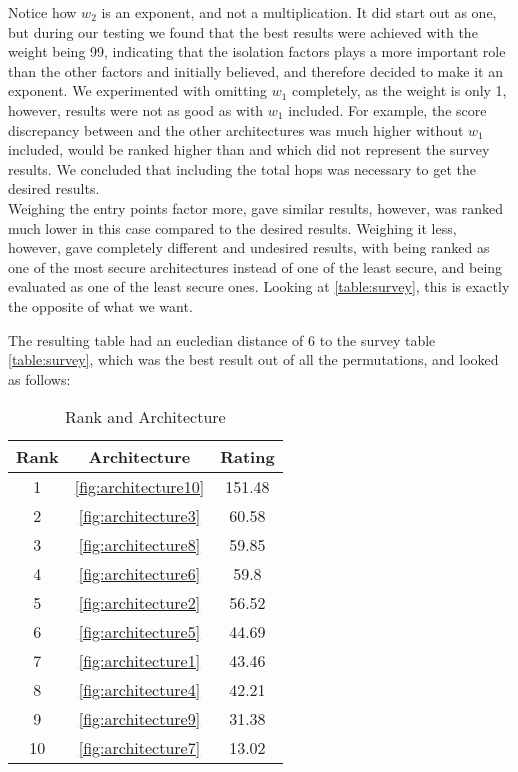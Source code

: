 Notice how $w_{2}$ is an exponent, and not a multiplication.
It did start out as one, but during our testing we found that the best results were achieved with the weight being 99,
indicating that the isolation factors plays a more important role than the other factors and initially believed, and therefore decided to make it an exponent.
We experimented with omitting $w_{1}$ completely, as the weight is only 1, however, results were not as good as with $w_{1}$ included.
For example, the score discrepancy between  and the other architectures was much higher without $w_{1}$ included,
 would be ranked higher than  and  
which did not represent the survey results. 
We concluded that including the total hops was necessary to get the desired results.\\
Weighing the entry points factor more, gave similar results, however,  was ranked 
much lower in this case compared to the desired results.
Weighing it less, however, gave completely different and undesired results, with  being ranked
as one of the most secure architectures instead of one of the least secure, and  being evaluated
as one of the least secure ones. Looking at \ref{table:survey}, this is exactly the opposite of what we want.\\

\label{sec:calibration}

The resulting table had an eucledian distance of 6 to the survey table \ref{table:survey}, which was the best result out of all the permutations, and looked as follows:\\

\begin{table}[h]
    \label{table:testcriteriaresults}
    \centering
    \caption{Rank and Architecture}
    \begin{tabular}{ |c|c|c| } 
    \hline
    Rank & Architecture & Rating\\
    \hline
    1 & \ref{fig:architecture10} & 151.48\\
    2 & \ref{fig:architecture3} & 60.58\\
    3 & \ref{fig:architecture8} & 59.85\\
    4 & \ref{fig:architecture6} & 59.8\\
    5 & \ref{fig:architecture2} & 56.52\\
    6 & \ref{fig:architecture5} & 44.69\\
    7 & \ref{fig:architecture1} & 43.46\\
    8 & \ref{fig:architecture4} & 42.21\\
    9 & \ref{fig:architecture9} & 31.38\\
    10 & \ref{fig:architecture7} & 13.02\\
    \hline
    \end{tabular}
\end{table}

